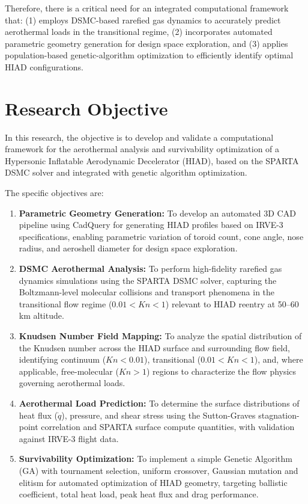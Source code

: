 Therefore, there is a critical need for an integrated computational framework that: (1) employs DSMC-based rarefied gas dynamics to accurately predict aerothermal loads in the transitional regime, (2) incorporates automated parametric geometry generation for design space exploration, and (3) applies population-based genetic-algorithm optimization to efficiently identify optimal HIAD configurations.

\section{Research Objective}
In this research, the objective is to develop and validate a computational framework for the aerothermal analysis and survivability optimization of a Hypersonic Inflatable Aerodynamic Decelerator (HIAD), based on the SPARTA DSMC solver and integrated with genetic algorithm optimization.

The specific objectives are:
\begin{enumerate}
    \item \textbf{Parametric Geometry Generation:} To develop an automated 3D CAD pipeline using CadQuery for generating HIAD profiles based on IRVE-3 specifications, enabling parametric variation of toroid count, cone angle, nose radius, and aeroshell diameter for design space exploration.

    \item \textbf{DSMC Aerothermal Analysis:} To perform high-fidelity rarefied gas dynamics simulations using the SPARTA DSMC solver, capturing the Boltzmann-level molecular collisions and transport phenomena in the transitional flow regime ($0.01 < Kn < 1$) relevant to HIAD reentry at 50--60 km altitude.

    \item \textbf{Knudsen Number Field Mapping:} To analyze the spatial distribution of the Knudsen number across the HIAD surface and surrounding flow field, identifying continuum ($Kn < 0.01$), transitional ($0.01 < Kn < 1$), and, where applicable, free-molecular ($Kn > 1$) regions to characterize the flow physics governing aerothermal loads.

    \item \textbf{Aerothermal Load Prediction:} To determine the surface distributions of heat flux ($\dot{q}$), pressure, and shear stress using the Sutton-Graves stagnation-point correlation and SPARTA surface compute quantities, with validation against IRVE-3 flight data.


    \item \textbf{Survivability Optimization:} To implement a simple Genetic Algorithm (GA) with tournament selection, uniform crossover, Gaussian mutation and elitism for automated optimization of HIAD geometry, targeting ballistic coefficient, total heat load, peak heat flux and drag performance.
\end{enumerate}

